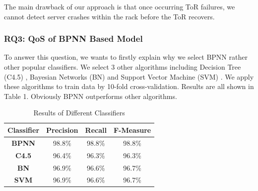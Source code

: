 \documentclass{sig-alternate-05-2015}
\begin{document}
The main drawback of our approach is that once occurring ToR failures, we cannot detect server crashes within the rack before the ToR recovers.


\subsubsection*{RQ3: QoS of BPNN Based Model}
\quad To answer this question, we wants to firstly explain why we select BPNN rather other popular classifiers. We select 3 other algorithms including Decision Tree (C4.5) \cite{quinlan2014c4}, Bayesian Networks (BN) \cite{jensen1996introduction} and Support Vector Machine (SVM) \cite{scholkopf1999advances}. We apply these algorithms to train data by 10-fold cross-validation. Results are all shown in Table 1. Obviously BPNN outperforms other algorithms.

\begin{table}
    \centering
    \caption{Results of Different Classifiers}
    \begin{tabular}{|c|c|c|c|} \hline
        \textbf{Classifier} & \textbf{Precision} & \textbf{Recall} & \textbf{F-Measure} \\ \hline
        \hline
        \textbf{BPNN} & 98.8\% & 98.8\% & 98.8\% \\ \hline
        \textbf{C4.5} & 96.4\% & 96.3\% & 96.3\% \\ \hline
        \textbf{BN} & 96.9\% & 96.6\% & 96.7\% \\ \hline
        \textbf{SVM} & 96.9\% & 96.6\% & 96.7\% \\ \hline
    \end{tabular}
\end{table}
\end{document}
